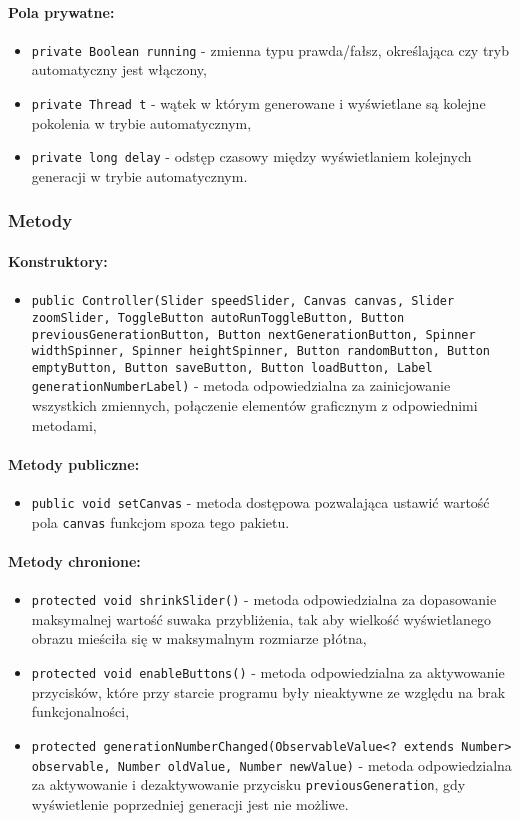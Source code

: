 \documentclass{report}
\begin{document}
\paragraph{Pola prywatne:}
\begin{itemize}
	\item \texttt{private Boolean running} - zmienna typu prawda/fałsz, określająca czy tryb automatyczny jest włączony,
	\item \texttt{private Thread t} - wątek w którym generowane i wyświetlane są kolejne pokolenia w trybie automatycznym\label{sec:thread},
	\item \texttt{private long delay} - odstęp czasowy między wyświetlaniem kolejnych generacji w trybie automatycznym.
\end{itemize}
\subsubsection{Metody}
\paragraph{Konstruktory:}
\begin{itemize}
 	\item \texttt{public Controller(Slider speedSlider, Canvas canvas, Slider zoomSlider, ToggleButton autoRunToggleButton, Button previousGenerationButton, Button nextGenerationButton, Spinner widthSpinner, Spinner heightSpinner, Button randomButton, Button emptyButton, Button saveButton, Button loadButton, Label generationNumberLabel)} - metoda odpowiedzialna za zainicjowanie wszystkich zmiennych, połączenie elementów graficznym z odpowiednimi metodami,
\end{itemize}
\paragraph{Metody publiczne:}
\begin{itemize}
 	\item \texttt{public void setCanvas} - metoda dostępowa pozwalająca ustawić wartość pola \texttt{canvas} funkcjom spoza tego pakietu.
\end{itemize}
\paragraph{Metody chronione:}
\begin{itemize}
 	\item \texttt{protected void shrinkSlider()} - metoda odpowiedzialna za dopasowanie maksymalnej wartość suwaka przybliżenia, tak aby 		wielkość wyświetlanego obrazu mieściła się w maksymalnym rozmiarze płótna,
 	\item \texttt{protected void enableButtons()} - metoda odpowiedzialna za aktywowanie przycisków, które przy starcie programu były 			nieaktywne ze względu na brak funkcjonalności,
 	\item \texttt{protected generationNumberChanged(ObservableValue<? extends Number> observable, Number oldValue, Number newValue)} - metoda odpowiedzialna za aktywowanie i dezaktywowanie przycisku 							\texttt{previousGeneration}, gdy wyświetlenie poprzedniej generacji jest nie możliwe.
\end{itemize}
\end{document}
